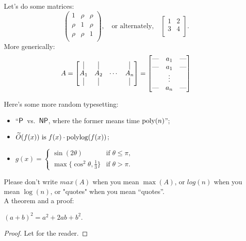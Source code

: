 Let's do some matrices:
\[
\begin{pmatrix}
    1 & \rho & \rho\\
    \rho & 1 & \rho\\
    \rho & \rho & 1\\
\end{pmatrix},
\quad \text{or alternately,} \quad
\begin{bmatrix}
    1 & 2 \\
    3 & 4 \\
\end{bmatrix}.
\]
More generically:
\[
    A = \begin{bmatrix}
            \vrule & \vrule & & \vrule\\
            A_{1} & A_{2} & \cdots & A_{n} \\
            \vrule & \vrule & & \vrule
        \end{bmatrix}
      = \begin{bmatrix}
            \text{---} & a_1 & \text{---} \\
            \text{---} & a_1 & \text{---} \\
                       & \vdots &  \\
            \text{---} & a_n & \text{---} 
        \end{bmatrix}
\]


Here's some more random typesetting: 
\begin{itemize}
\item ``$\mathsf{P}$~vs.~$\mathsf{NP}$, where the former means time $\mathrm{poly}(n)$'';
\item $\widetilde{O}(f(x)) \text{ is } f(x) \cdot \mathrm{polylog}(f(x))$;
\item $\displaystyle 
        g(x) = \begin{cases}
                   \sin(2\theta) & \text{if $\theta \leq \pi$,}\\
                   \max\{\cos^2\theta, \tfrac13\} & \text{if $\theta > \pi$.}
               \end{cases}
      $
      
\end{itemize}
Please don't write $max(A)$ when you mean $\max(A)$, or $log(n)$ when you mean $\log(n)$, or "quotes" when you mean ``quotes''.\\

A theorem and a proof:
\begin{theorem} $(a+b)^2 = a^2 + 2ab + b^2$.
\end{theorem}
\begin{proof}
Let for the reader.
\end{proof}

